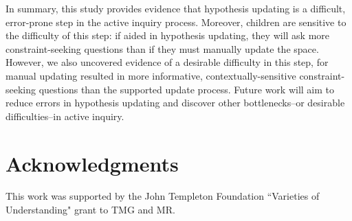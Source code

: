 \documentclass[man,floatsintext]{apa6}
\begin{document}
In summary, this study provides evidence that hypothesis updating is a difficult, error-prone step in the active inquiry process. Moreover, children are sensitive to the difficulty of this step: if aided in hypothesis updating, they will ask more constraint-seeking questions than if they must manually update the space. However, we also uncovered evidence of a desirable difficulty in this step, for manual updating resulted in more informative, contextually-sensitive constraint-seeking questions than the supported update process. Future work will aim to reduce errors in hypothesis updating and discover other bottlenecks--or desirable difficulties--in active inquiry.



\section{Acknowledgments}
This work was supported by the John Templeton Foundation ``Varieties of 
Understanding" grant to TMG and MR.
\vspace{-.2cm}




\end{document}
